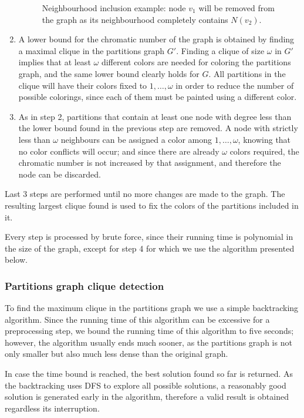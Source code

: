\begin{enumerate}
\begin{figure}
\begin{tikzpicture}
	\end{tikzpicture} 
\caption{Neighbourhood inclusion example: node $v_1$ will be removed from the graph as its neighbourhood completely contains $N(v_2)$.}
	\label{fig:neighbourinclusion}
\end{figure}
	
	\item{A lower bound for the chromatic number of the graph is obtained by finding a maximal clique in the partitions graph $G'$. Finding a clique of size $\omega$ in $G'$ implies that at least $\omega$ different colors are needed for coloring the partitions graph, and the same lower bound clearly holds for $G$. All partitions in the clique will have their colors fixed to $1,\ldots,\omega$ in order to reduce the number of possible colorings, since each of them must be painted using a different color.}
	\item{As in step 2, partitions that contain at least one node with degree less than the lower bound found in the previous step are removed. A node with strictly less than $\omega$ neighbours can be assigned a color among $1,\ldots,\omega$, knowing that no color conflicts will occur; and since there are already $\omega$ colors required, the chromatic number is not increased by that assignment, and therefore the node can be discarded.}
\end{enumerate}

Last 3 steps are performed until no more changes are made to the graph. The resulting largest clique found is used to fix the colors of the partitions included in it. 

Every step is processed by brute force, since their running time is polynomial in the size of the graph, except for step 4 for which we use the algorithm presented below.

\subsubsection{Partitions graph clique detection}

To find the maximum clique in the partitions graph we use a simple backtracking algorithm. Since the running time of this algorithm can be excessive for a preprocessing step, we bound the running time of this algorithm to five seconds; however, the algorithm usually ends much sooner, as the partitions graph is not only smaller but also much less dense than the original graph. 

In case the time bound is reached, the best solution found so far is returned. As the backtracking uses DFS to explore all possible solutions, a reasonably good solution is generated early in the algorithm, therefore a valid result is obtained regardless its interruption.

